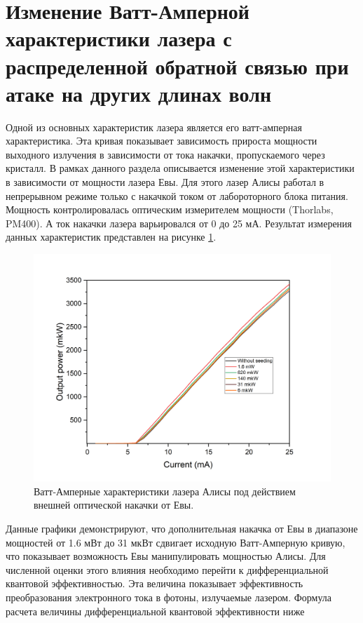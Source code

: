 \section{Изменение Ватт-Амперной характеристики лазера с распределенной обратной связью при атаке на других длинах волн}\label{sec:ch4/sect3}
Одной из основных характеристик лазера является его ватт-амперная характеристика. Эта кривая показывает зависимость прироста мощности выходного излучения в зависимости от тока накачки, пропускаемого через кристалл. В рамках данного раздела описывается изменение этой характеристики в зависимости от мощности лазера Евы.
Для этого лазер Алисы работал в непрерывном режиме только с накачкой током от лабороторного блока питания. Мощность контролировалась оптическим измерителем мощности (Thorlabs, PM400). А ток накачки лазера варьировался от 0 до 25 мА. 
Результат измерения данных характеристик представлен на рисунке \ref{fig:Watt-Amp ch4}. 
\begin{figure}
    \centering
    \includegraphics[width=\textwidth]{images/ватт ампер для диссера.png}
    \caption{Ватт-Амперные характеристики лазера Алисы под действием внешней оптической накачки от Евы.}
    \label{fig:Watt-Amp ch4}
\end{figure}
Данные графики демонстрируют, что дополнительная накачка от Евы в диапазоне мощностей от 1.6 мВт до 31 мкВт сдвигает исходную Ватт-Амперную кривую, что показывает возможность Евы манипулировать мощностью Алисы. Для численной оценки этого влияния необходимо перейти к дифференциальной квантовой эффективностью. Эта величина показывает эффективность преобразования электронного тока в фотоны, излучаемые лазером. Формула расчета величины дифференциальной квантовой эффективности ниже 
